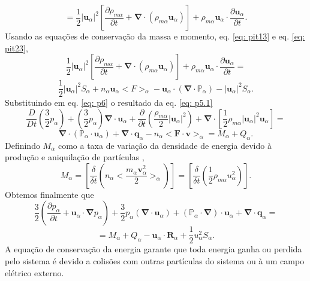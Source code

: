 \documentclass[12pt,oneside,a4paper]{abntex2}
\begin{document}
\begin{equation*}
= \frac{1}{2}|\bm{u}_\alpha|^2 \left[  \frac{\partial \rho_{m\alpha} }{\partial t} +  \bm{\nabla} \cdot (\rho_{m\alpha} \bm{u}_\alpha)   \right] + \rho_{m\alpha}  \bm{u}_\alpha \cdot \frac{\partial \bm{u}_\alpha}{\partial t} .
\end{equation*}
 Usando as equações de conservação da massa e momento, eq. \ref{eq: pit13} e eq. \ref{eq: pit23}, 
\begin{equation}
\label{eq: p6}
 \frac{1}{2}|\bm{u}_\alpha|^2 \left[  \frac{\partial \rho_{m\alpha} }{\partial t} +  \bm{\nabla} \cdot (\rho_{m\alpha} \bm{u}_\alpha)   \right] + \rho_{m\alpha}  \bm{u}_\alpha \cdot \frac{\partial \bm{u}_\alpha}{\partial t} =
\end{equation} 
\begin{equation*} \frac{1}{2}|\bm{u}_\alpha|^2 S_\alpha + n_\alpha\bm{u}_\alpha<F>_\alpha-\bm{u}_\alpha \cdot (\bm{\nabla} \cdot \mathbb{P}_\alpha)-|\bm{u}_\alpha|^2 S_\alpha.
 \end{equation*} 
Substituindo em eq. \ref{eq: p6} o resultado da eq. \ref{eq: p5.1}
 \begin{equation}
\label{eq: p5}
\frac{D}{Dt} \left( \frac{3}{2}p_\alpha \right) + \left(\frac{3}{2}p_\alpha \right)  \bm{\nabla} \cdot \bm{u}_\alpha +  \frac{\partial }{\partial t} \left(\frac{\rho_{m\alpha}}{2} |\bm{u}_\alpha|^2 \right) +\bm{\nabla} \cdot \left[ \frac{1}{2}\rho_{m\alpha}|\bm{u}_\alpha|^2 \bm{u}_\alpha \right]  = 
\end{equation}
\begin{equation*}
\bm{\nabla} \cdot (\mathbb{P}_\alpha \cdot \bm{u}_\alpha) + \bm{\nabla} \cdot \bm{q}_\alpha-n_\alpha <\bm{F} \cdot \bm{v}>_\alpha = M_\alpha +Q_\alpha.
\end{equation*}
Definindo $M_\alpha$ como a taxa de variação da densidade de energia devido à produção e aniquilação de partículas \cite[pg. 204]{bittencourt}, 
\begin{equation}
M_\alpha = \left[ \frac{\delta}{\delta t}(n_\alpha<\frac{m_\alpha \bm{v}^2_\alpha}{2}>_\alpha) \right] = \left[ \frac{\delta}{\delta t}\left( \frac{1}{2} \rho_{m\alpha} u^2_\alpha \right) \right] .
\end{equation}
Obtemos finalmente que
\begin{equation}
\label{concenergia}
\frac{3}{2} \left( \frac{\partial p_\alpha}{\partial t} + \bm{u}_\alpha \cdot \bm{\nabla} p_\alpha\right)+ \frac{3}{2} p_\alpha (\bm{\nabla} \cdot \bm{u}_\alpha)+(\mathbb{P}_\alpha \cdot \bm{\nabla})\cdot \bm{u}_\alpha + \bm{\nabla} \cdot \bm{q}_\alpha =  
\end{equation}
\begin{equation*}
= M_\alpha+Q_\alpha-\bm{u}_\alpha \cdot \bm{R}_\alpha +\frac{1}{2}u^2_\alpha S_\alpha .
\end{equation*}
A equação de conservação da energia garante que toda energia ganha ou perdida pelo sistema é devido a colisões com outras partículas do sistema ou à um campo elétrico externo.
\end{document}
